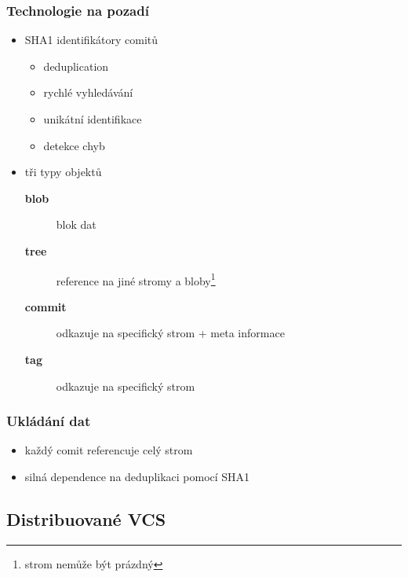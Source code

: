 \documentclass[pdftex]{beamer}
\begin{document}
\begin{frame}
\frametitle{Technologie na pozadí}
	\begin{itemize}
		\item	SHA1 identifikátory comitů
		\begin{itemize}
			\item	deduplication
			\item	rychlé vyhledávání
			\item	unikátní identifikace
			\item	detekce chyb
		\end{itemize}

		\item	tři typy objektů
		\begin{description}
			\item[\textbf{blob}]	blok dat
			\item[\textbf{tree}]	reference na jiné stromy a bloby\footnote{strom nemůže být prázdný}
			\item[\textbf{commit}]	odkazuje na specifický strom + meta informace
			\item[\textbf{tag}]	odkazuje na specifický strom
		\end{description}
	\end{itemize}
\end{frame}

\begin{frame}
	\frametitle{Ukládání dat}
	\begin{itemize}
		\item	každý comit referencuje celý strom
		\item	silná dependence na deduplikaci pomocí SHA1
	\end{itemize}
\end{frame}

\subsection{Distribuované VCS}
\end{document}
